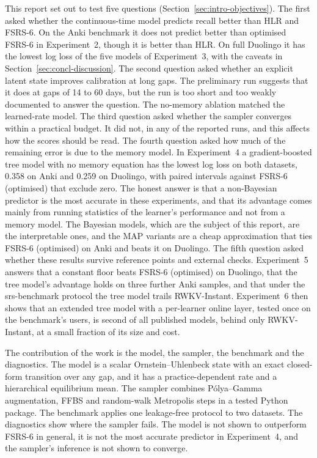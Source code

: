 This report set out to test five questions (Section~\ref{sec:intro-objectives}). The first asked whether the
continuous-time model predicts recall better than HLR and FSRS-6. On the Anki benchmark it does not predict better than
optimised FSRS-6 in Experiment~2, though it is better than HLR. On full Duolingo it has the lowest log loss of the five models of Experiment~3, with the
caveats in Section~\ref{sec:concl-discussion}. The second question asked whether an explicit latent state improves
calibration at long gaps. The preliminary run suggests that it does at gaps of 14 to 60 days, but the run is too short and
too weakly documented to answer the question. The no-memory ablation matched the learned-rate model. The third question asked
whether the sampler converges within a practical budget. It did not, in any of the reported runs, and this affects how the
scores should be read. The fourth question asked how much of the remaining error is due to the memory model. In Experiment~4 a gradient-boosted tree model with no memory equation has the lowest log loss on both datasets, 0.358 on Anki and 0.259 on Duolingo, with paired intervals against FSRS-6 (optimised) that exclude zero. The honest answer is that a non-Bayesian predictor is the most accurate in these experiments, and that its advantage comes mainly from running statistics of the learner's performance and not from a memory model. The Bayesian models, which are the subject of this report, are the interpretable ones, and the MAP variants are a cheap approximation that ties FSRS-6 (optimised) on Anki and beats it on Duolingo. The fifth question asked whether these results survive reference points and external checks. Experiment~5 answers that a constant floor beats FSRS-6 (optimised) on Duolingo, that the tree model's advantage holds on three further Anki samples, and that under the srs-benchmark protocol the tree model trails RWKV-Instant. Experiment~6 then shows that an extended tree model with a per-learner online layer, tested once on the benchmark's users, is second of all published models, behind only RWKV-Instant, at a small fraction of its size and cost.

The contribution of the work is the model, the sampler, the benchmark and the diagnostics. The model is a scalar
Ornstein--Uhlenbeck state with an exact closed-form transition over any gap, and it has a practice-dependent rate and a
hierarchical equilibrium mean. The sampler combines P\'olya--Gamma augmentation, FFBS and random-walk Metropolis steps in a
tested Python package. The benchmark applies one leakage-free protocol to two datasets. The diagnostics show where the sampler
fails. The model is not shown to outperform FSRS-6 in general, it is not the most accurate predictor in Experiment~4, and the sampler's inference is not shown to converge.

